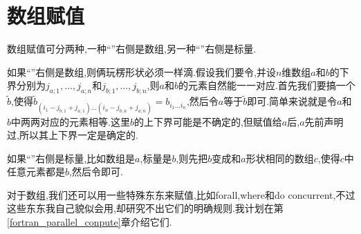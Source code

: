 \section{数组赋值}\label{fortran_array_assignment}

数组赋值可分两种,一种``\ttt{=}''右侧是数组,另一种``\ttt{=}''右侧是标量.

如果``\ttt{=}''右侧是数组,则俩玩楞形状必须一样滴.假设我们要令,并设$n$维数组$a$和$b$的下界分别为$j_{a;1},\dots,j_{a;n}$和$j_{b;1},\dots,j_{b;n}$,则$a$和$b$的元素自然能一一对应.首先我们要搞一个$\tilde{b}$,使得$\tilde{b}_{(i_1-j_{b;1}+j_{a;1})\dots(i_n-j_{b;n}+j_{a;n})}=b_{i_1\dots i_n}$,然后令$a$等于$\tilde{b}$即可.简单来说就是令$a$和$b$中两两对应的元素相等.这里$b$的上下界可能是不确定的,但赋值给$a$后,$a$先前声明过,所以其上下界一定是确定的.

如果``\ttt{=}''右侧是标量,比如数组是$a$,标量是$b$,则先把$b$变成和$a$形状相同的数组$c$,使得$c$中任意元素都是$b$,然后令即可.

对于数组,我们还可以用一些特殊东东来赋值,比如forall,where和do concurrent,不过这些东东我自己貌似会用,却研究不出它们的明确规则.我计划在第\ref{fortran_parallel_conpute}章介绍它们.

